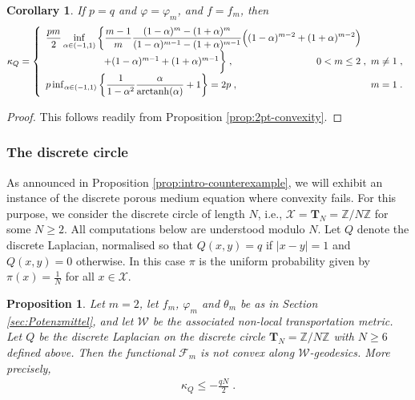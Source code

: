 \documentclass[a4paper,11pt,reqno]{amsart}
\theoremstyle{plain}
\newtheorem{corollary}[theorem]{Corollary}
\newtheorem{proposition}[theorem]{Proposition}
\theoremstyle{remark}
\numberwithin{equation}{section}
\begin{document}
\begin{corollary}
If $p = q$ and ${\varphi} = {\varphi}_m$, and $f = f_m$, then
\begin{align*}
  \kappa_Q &= 
   \left\{ \begin{array}{ll}
\displaystyle{\frac{pm}2} \inf_{\alpha \in (-1,1)} \bigg\{
\displaystyle{\frac{m-1}{m}
\frac{   (1-\alpha)^{m} - (1+\alpha)^{m}}
	 {(1-\alpha)^{m-1} - (1+\alpha)^{m-1}}}
  \Big( (1-\alpha)^{m-2} + (1+\alpha)^{m-2}\Big)
\\\qquad\qquad\qquad
 + (1-\alpha)^{m-1} + (1+\alpha)^{m-1}  \bigg\}\;,
   & \hspace{-13ex}0 < m \leq 2\;, \  m \neq 1\;,\\
p \inf_{\alpha \in (-1,1)} \bigg\{
\displaystyle{\frac{1}{1-\alpha^2}\frac{\alpha}{\operatorname{arctanh}(\alpha)}
+1 } \bigg\}
 = 2p\;, 
   & m = 1\;.\end{array} \right.\\
\end{align*}
\end{corollary}

\begin{proof}
This follows readily from Proposition \ref{prop:2pt-convexity}.
\end{proof}

\subsubsection{The discrete circle}

As announced in Proposition \ref{prop:intro-counterexample}, we will
exhibit an instance of the discrete porous medium equation where
convexity fails.  For this purpose, we consider the discrete circle of
length $N$, i.e., ${\mathcal{X}} = {\mathbf{T}}_N = {{\mathbb Z}} / N {{\mathbb Z}}$ for some $N \geq 2$. All
computations below are understood modulo $N$. Let $Q$ denote the
discrete Laplacian, normalised so that $Q(x,y) = q$ if $|x - y| = 1$
and $Q(x,y) = 0$ otherwise. In this case $\pi$ is the uniform
probability given by $\pi(x) = \frac1N$ for all $x \in {\mathcal{X}}$.

\begin{proposition}\label{prop:counterexample}
  Let $m = 2$, let $f_m$, ${\varphi}_m$ and $\theta_m$ be as in Section
  \ref{sec:Potenzmittel}, and let ${\mathcal{W}}$ be the associated non-local
  transportation metric.  Let $Q$ be the discrete Laplacian on the
  discrete circle ${\mathbf{T}}_N={{\mathbb Z}}/N{{\mathbb Z}}$ with $N\geq6$ defined above.  Then
  the functional ${\mathcal{F}}_m$ is not convex along ${\mathcal{W}}$-geodesics. More
  precisely,
\begin{align*}
 \kappa_Q \leq -\frac{qN}{2}\;.
\end{align*}
\end{proposition}
\end{document}
